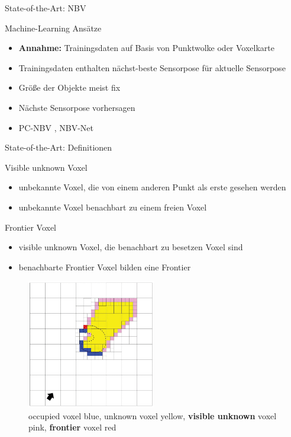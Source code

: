 \documentclass{beamer}
\begin{document}
\begin{frame}{State-of-the-Art: NBV}
	\begin{block}{Machine-Learning Ansätze}
		\begin{itemize}
			\item \textbf{Annahme:} Trainingsdaten auf Basis von Punktwolke oder Voxelkarte
			\item Trainingsdaten enthalten nächst-beste Sensorpose für aktuelle Sensorpose
			\item Größe der Objekte meist fix
			\item Nächste Sensorpose vorhersagen
			\item PC-NBV \cite{zeng_pc-nbv_2020}, NBV-Net \cite{mendoza_supervised_2020}

		\end{itemize}
	\end{block}
\end{frame}

\begin{frame}{State-of-the-Art: Definitionen}
	\begin{exampleblock}{Visible unknown Voxel}
		\begin{itemize}
			\item unbekannte Voxel, die von einem anderen Punkt als erste gesehen werden
			\item unbekannte Voxel benachbart zu einem freien Voxel
		\end{itemize}
		\cite{vasquez-gomez_vpl_2020}
	\end{exampleblock}
	\begin{exampleblock}{Frontier Voxel}
		\begin{itemize}
			\item visible unknown Voxel, die benachbart zu besetzen Voxel sind
			\item benachbarte Frontier Voxel bilden eine Frontier

		\end{itemize}
		\cite{vasquez-gomez_vpl_2020}
	\end{exampleblock}
\end{frame}

\begin{frame}{}
	\centering
	\begin{figure}
		\includegraphics[width=0.5\textwidth]{Graphics/vasquez.png}
		\caption{occupied voxel blue, unknown voxel yellow, \textbf{visible unknown} voxel pink, \textbf{frontier} voxel red \cite{vasquez-gomez_vpl_2020}}
	\end{figure}
\end{frame}
\end{document}
